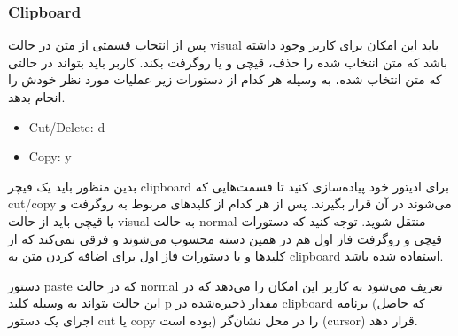 
\subsubsection*{{\titr Clipboard}}


پس از انتخاب قسمتی از متن در حالت
visual
باید این امکان برای کاربر وجود داشته باشد که متن انتخاب شده را حذف، قیچی و یا روگرفت بکند. کاربر باید بتواند در حالتی که متن انتخاب شده، به وسیله هر کدام از دستورات زیر عملیات مورد نظر خودش را انجام بدهد.

\begin{latin}
    \begin{itemize}
        \item{Cut/Delete}: d
        \item{Copy}: y
    \end{itemize}
\end{latin}

بدین منظور باید یک فیچر clipboard برای ادیتور خود پیاده‌سازی کنید تا قسمت‌هایی که cut/copy می‌شوند در آن قرار بگیرند. پس از هر کدام از کلیدهای مربوط به روگرفت و یا قیچی باید از حالت visual به حالت normal منتقل شوید.
توجه کنید که دستورات قیچی و روگرفت فاز اول هم در همین دسته محسوب می‌شوند و فرقی نمی‌کند که از کلیدها و یا دستورات فاز اول برای اضافه کردن متن به clipboard استفاده شده باشد.

دستور paste که در حالت normal تعریف می‌شود
به کاربر این امکان را می‌دهد که در این حالت بتواند به وسیله کلید p مقدار ذخیره‌شده در clipboard برنامه (که حاصل اجرای یک دستور cut یا copy بوده است) را در محل نشان‌گر (cursor) قرار دهد.

\newpage
